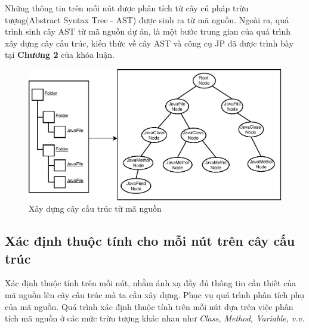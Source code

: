 \documentclass[12pt]{report}
\begin{document}
\noindent Những thông tin trên mỗi nút được phân tích từ cây cú pháp trừu tượng(Abstract Syntax Tree - AST) được sinh ra từ mã nguồn. Ngoài ra, quá trình sinh cây AST từ mã nguồn dự án, là một bước trung gian của quá trình xây dựng cây cấu trúc, kiến thức về cây AST và công cụ JP đã được trình bày tại \textbf{Chương 2} của khóa luận.
\begin{figure}[!htbp]
	\centering
	\vspace{0.5cm}
	\includegraphics[scale=0.9]{images/structure_tree.pdf}
	\caption{Xây dựng cây cấu trúc từ mã nguồn}
	\label{fig:universe}
\end{figure}
\subsection{Xác định thuộc tính cho mỗi nút trên cây cấu trúc}
Xác định thuộc tính trên mỗi nút, nhằm ánh xạ đầy đủ thông tin cần thiết của mã nguồn lên cây cấu trúc mà ta cần xây dựng. Phục vụ quá trình phân tích phụ của mã nguồn. Quá trình xác định thuộc tính trên mỗi nút dựa trên việc phân tích mã nguồn ở các mức trừu tượng khác nhau như \textit{Class, Method, Variable, v.v.}
\end{document}
